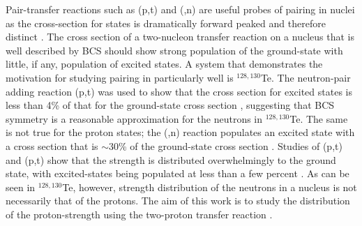 Pair-transfer reactions such as (p,t) and (,n) are useful probes of pairing in nuclei as the cross-section for \zp states is dramatically forward peaked and therefore distinct \cite{Yoshida}.  The cross section of a two-nucleon transfer reaction on a nucleus that is well described by BCS should show strong population of the \zp ground-state with little, if any, population of \zp excited states.  A system that demonstrates the motivation for studying pairing in  particularly well is $^{128,130}$Te.  The neutron-pair adding reaction (p,t) was used to show that the cross section for excited \zp states is less than 4\% of that for the ground-state \zp cross section \cite{neutronPairsTellurium}, suggesting that BCS symmetry is a reasonable approximation for the neutrons in $^{128,130}$Te.  The same is not true for the proton states; the (,n) reaction populates an excited \zp state with a cross section that is $\sim$30\% of the ground-state cross section \cite{protonPairsTellurium}.  Studies of (p,t) and (p,t) show that the \zp strength is distributed overwhelmingly to the ground state, with excited-\zp states being populated at less than a few percent \cite{neutronPairsGermanium}.  As can be seen in $^{128,130}$Te, however, \zp strength distribution of the neutrons in a nucleus is not necessarily that of the protons.  The aim of this work is to study the distribution of the proton-\zp strength using the two-proton transfer reaction \reaction.   


